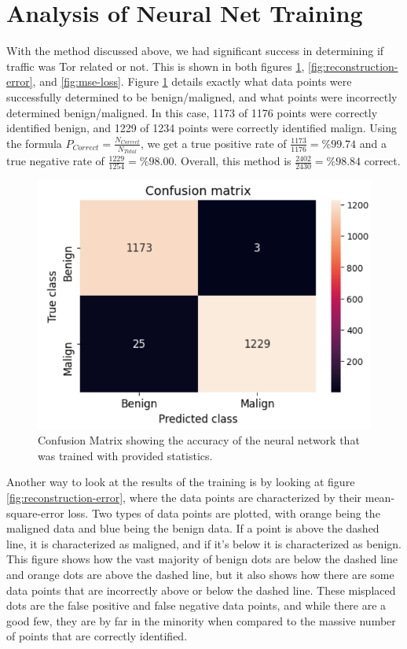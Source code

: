 \documentclass[conference,12pt]{IEEEtran}
\begin{document}
\section{Analysis of Neural Net Training}
With the method discussed above, we had significant success in determining if traffic was Tor related or not. This is shown in both figures \ref{fig:confusion-matrix}, \ref{fig:reconstruction-error}, and \ref{fig:mse-loss}. Figure \ref{fig:confusion-matrix} details exactly what data points were successfully determined to be benign/maligned, and what points were incorrectly determined benign/maligned. In this case, 1173 of 1176 points were correctly identified benign, and 1229 of 1234 points were correctly identified malign. Using the formula $P_{Correct}= \frac{N_{Correct}} {N_{Total}}$, we get a true positive rate of $\frac{1173}{1176} = \%99.74$ and a true negative rate of $\frac{1229}{1254} = \%98.00$. Overall, this method is $\frac{2402}{2430} = \%98.84$ correct.

\begin{figure}[H]
    \centering
    \includegraphics[scale=0.63]{Project-Results/Confusion-Matrix.png}
    \caption{Confusion Matrix showing the accuracy of the neural network that was trained with provided statistics.}
    \label{fig:confusion-matrix}
\end{figure}

Another way to look at the results of the training is by looking at figure \ref{fig:reconstruction-error}, where the data points are characterized by their mean-square-error loss. Two types of data points are plotted, with orange being the maligned data and blue being the benign data. If a point is above the dashed line, it is characterized as maligned, and if it's below it is characterized as benign. This figure shows how the vast majority of benign dots are below the dashed line and orange dots are above the dashed line, but it also shows how there are some data points that are incorrectly above or below the dashed line. These misplaced dots are the false positive and false negative data points, and while there are a good few, they are by far in the minority when compared to the massive number of points that are correctly identified.
\end{document}
